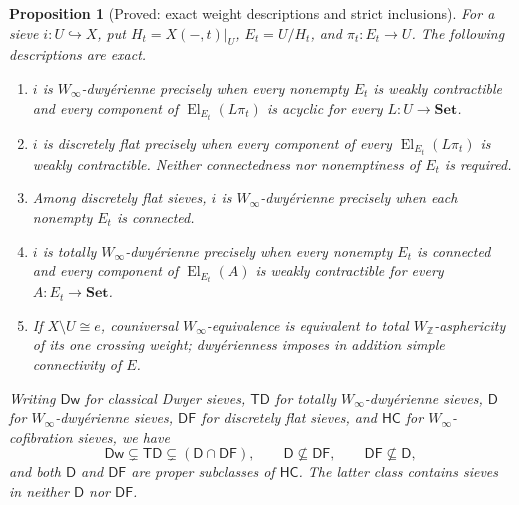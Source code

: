 \documentclass[11pt,a4paper]{article}
\newtheorem{proposition}[theorem]{Proposition}
\theoremstyle{definition}
\theoremstyle{remark}
\newcommand{\Set}{\mathbf{Set}}
\newcommand{\Winfty}{W_\infty}
\newcommand{\WZ}{W_{\mathbb Z}}
\newcommand{\El}{\operatorname{El}}
\begin{document}
\begin{proposition}[Proved: exact weight descriptions and strict inclusions]\label{B:classes}
For a sieve $i:U\hookrightarrow X$, put $H_t=X(-,t)|_U$, $E_t=U/H_t$, and $\pi_t:E_t\to U$. The following descriptions are exact.
\begin{enumerate}[label=(\alph*)]
\item $i$ is $\Winfty$-dwy\'erienne precisely when every nonempty $E_t$ is weakly contractible and every component of $\El_{E_t}(L\pi_t)$ is acyclic for every $L:U\to\Set$.
\item $i$ is discretely flat precisely when every component of every $\El_{E_t}(L\pi_t)$ is weakly contractible. Neither connectedness nor nonemptiness of $E_t$ is required.
\item Among discretely flat sieves, $i$ is $\Winfty$-dwy\'erienne precisely when each nonempty $E_t$ is connected.
\item $i$ is totally $\Winfty$-dwy\'erienne precisely when every nonempty $E_t$ is connected and every component of $\El_{E_t}(A)$ is weakly contractible for every $A:E_t\to\Set$.
\item If $X\setminus U\cong e$, couniversal $\Winfty$-equivalence is equivalent to total $\WZ$-asphericity of its one crossing weight; dwy\'erienness imposes in addition simple connectivity of $E$.
\end{enumerate}
Writing $\mathsf{Dw}$ for classical Dwyer sieves, $\mathsf{TD}$ for totally $\Winfty$-dwy\'erienne sieves, $\mathsf D$ for $\Winfty$-dwy\'erienne sieves, $\mathsf{DF}$ for discretely flat sieves, and $\mathsf{HC}$ for $\Winfty$-cofibration sieves, we have
\[
 \mathsf{Dw}\subsetneq\mathsf{TD}\subsetneq
 (\mathsf D\cap\mathsf{DF}),\qquad
 \mathsf D\nsubseteq\mathsf{DF},\qquad
 \mathsf{DF}\nsubseteq\mathsf D,
\]
and both $\mathsf D$ and $\mathsf{DF}$ are proper subclasses of $\mathsf{HC}$. The latter class contains sieves in neither $\mathsf D$ nor $\mathsf{DF}$.
\end{proposition}
\end{document}
